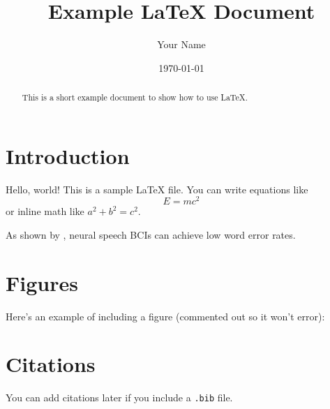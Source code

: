 \documentclass[12pt,a4paper]{article}
\title{Example \LaTeX{} Document}
\author{Your Name}
\date{\today}
\begin{document}
\maketitle

\begin{abstract}
This is a short example document to show how to use \LaTeX{}.
\end{abstract}

\section{Introduction}
Hello, world! This is a sample \LaTeX{} file.  
You can write equations like
\[
E = mc^2
\]
or inline math like $a^2 + b^2 = c^2$.

As shown by \citet{willett_high-performance_2023}, neural speech BCIs can achieve low word error rates.

\section{Figures}
Here’s an example of including a figure (commented out so it won’t error):


\section{Citations}
You can add citations later if you include a \texttt{.bib} file.



\end{document}
